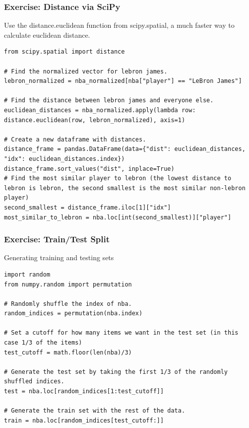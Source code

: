 \begin{frame}[fragile]\frametitle{Exercise: Distance via SciPy}
Use the distance.euclidean function from scipy.spatial, a much faster way to calculate euclidean distance.
\begin{lstlisting}
from scipy.spatial import distance

# Find the normalized vector for lebron james.
lebron_normalized = nba_normalized[nba["player"] == "LeBron James"]

# Find the distance between lebron james and everyone else.
euclidean_distances = nba_normalized.apply(lambda row: distance.euclidean(row, lebron_normalized), axis=1)

# Create a new dataframe with distances.
distance_frame = pandas.DataFrame(data={"dist": euclidean_distances, "idx": euclidean_distances.index})
distance_frame.sort_values("dist", inplace=True)
# Find the most similar player to lebron (the lowest distance to lebron is lebron, the second smallest is the most similar non-lebron player)
second_smallest = distance_frame.iloc[1]["idx"]
most_similar_to_lebron = nba.loc[int(second_smallest)]["player"]
\end{lstlisting}
\end{frame}

\begin{frame}[fragile]\frametitle{Exercise: Train/Test Split}
Generating training and testing sets
\begin{lstlisting}
import random
from numpy.random import permutation

# Randomly shuffle the index of nba.
random_indices = permutation(nba.index)

# Set a cutoff for how many items we want in the test set (in this case 1/3 of the items)
test_cutoff = math.floor(len(nba)/3)

# Generate the test set by taking the first 1/3 of the randomly shuffled indices.
test = nba.loc[random_indices[1:test_cutoff]]

# Generate the train set with the rest of the data.
train = nba.loc[random_indices[test_cutoff:]]
\end{lstlisting}
\end{frame}

